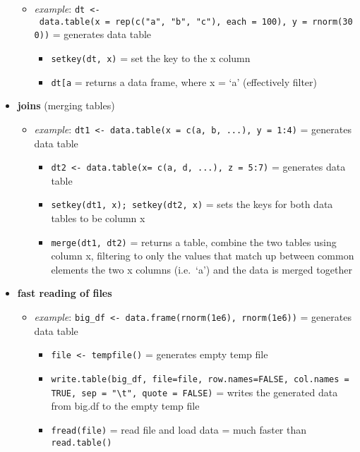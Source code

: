 \documentclass[
]{article}
\providecommand{\tightlist}{%
  \setlength{\itemsep}{0pt}\setlength{\parskip}{0pt}}
\begin{document}
\begin{itemize}
  \begin{itemize}
  \tightlist
  \item
    \emph{example}:
    \texttt{dt\ \textless{}-\ data.table(x\ =\ rep(c("a",\ "b",\ "c"),\ each\ =\ 100),\ y\ =\ rnorm(300))}
    = generates data table

    \begin{itemize}
    \tightlist
    \item
      \texttt{setkey(dt,\ x)} = set the key to the x column
    \item
      \texttt{dt{[}\textquotesingle{}a\textquotesingle{}{]}} = returns a
      data frame, where x = `a' (effectively filter)
    \end{itemize}
  \end{itemize}
\item
  \textbf{joins} (merging tables)

  \begin{itemize}
  \tightlist
  \item
    \emph{example}:
    \texttt{dt1\ \textless{}-\ data.table(x\ =\ c(\textquotesingle{}a\textquotesingle{},\ \textquotesingle{}b\textquotesingle{},\ ...),\ y\ =\ 1:4)}
    = generates data table

    \begin{itemize}
    \tightlist
    \item
      \texttt{dt2\ \textless{}-\ data.table(x=\ c(\textquotesingle{}a\textquotesingle{},\ \textquotesingle{}d\textquotesingle{},\ ...),\ z\ =\ 5:7)}
      = generates data table
    \item
      \texttt{setkey(dt1,\ x);\ setkey(dt2,\ x)} = sets the keys for
      both data tables to be column x
    \item
      \texttt{merge(dt1,\ dt2)} = returns a table, combine the two
      tables using column x, filtering to only the values that match up
      between common elements the two x columns (i.e.~`a') and the data
      is merged together
    \end{itemize}
  \end{itemize}
\item
  \textbf{fast reading of files}

  \begin{itemize}
  \tightlist
  \item
    \emph{example}:
    \texttt{big\_df\ \textless{}-\ data.frame(rnorm(1e6),\ rnorm(1e6))}
    = generates data table

    \begin{itemize}
    \tightlist
    \item
      \texttt{file\ \textless{}-\ tempfile()} = generates empty temp
      file
    \item
      \texttt{write.table(big\_df,\ file=file,\ row.names=FALSE,\ col.names\ =\ TRUE,\ sep\ =\ "\textbackslash{}t",\ quote\ =\ FALSE)}
      = writes the generated data from big.df to the empty temp file
    \item
      \texttt{fread(file)} = read file and load data = much faster than
      \texttt{read.table()}
    \end{itemize}
  \end{itemize}
\end{itemize}
\end{document}

